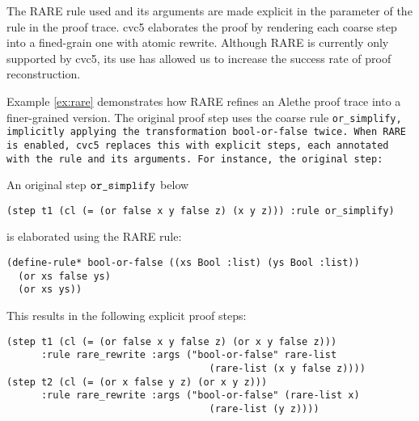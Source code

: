 The RARE rule used and its arguments are made explicit in the  parameter of the rule  in the proof trace.
cvc5 elaborates the proof by rendering each coarse step into a fined-grain one with atomic rewrite.
Although RARE is currently only supported by cvc5, its use has allowed us to increase the success rate of proof reconstruction.

Example \ref{ex:rare} demonstrates how RARE refines an Alethe proof trace into a finer-grained version.
The original proof step uses the coarse rule \tt{or\_simplify}, implicitly applying the transformation \tt{bool-or-false} twice.
When RARE is enabled, cvc5 replaces this with explicit steps, each annotated with the rule and its arguments.
For instance, the original step:

\begin{example}\label{ex:rare}
An original step $\texttt{\upshape{or\_simplify}}$ below
\begin{lstlisting}[language=SMT,numbers=none]
(step t1 (cl (= (or false x y false z) (x y z))) :rule or_simplify)
\end{lstlisting}
%
is elaborated using the RARE rule:

\begin{lstlisting}[language=SMT,numbers=none]
(define-rule* bool-or-false ((xs Bool :list) (ys Bool :list))
  (or xs false ys)
  (or xs ys))
\end{lstlisting}

This results in the following explicit proof steps:

%
\begin{lstlisting}[language=SMT]
(step t1 (cl (= (or false x y false z) (or x y false z)))
      :rule rare_rewrite :args ("bool-or-false" rare-list
                                   (rare-list (x y false z))))
(step t2 (cl (= (or x false y z) (or x y z)))
      :rule rare_rewrite :args ("bool-or-false" (rare-list x)
                                   (rare-list (y z))))
\end{lstlisting}
\end{example}
